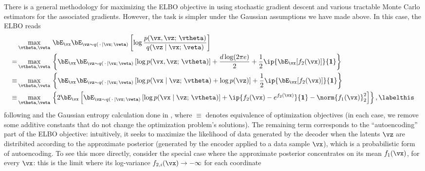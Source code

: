 \documentclass[../../book-main.tex]{subfiles}
\begin{document}
There is a general methodology for maximizing the ELBO objective in
 using stochastic gradient descent and various tractable
Monte Carlo estimators for the associated gradients. However, the task is
simpler under the Gaussian assumptions we have made above. In this case, the
ELBO reads
\begin{align*}
&\max_{\vtheta, \veta}\,
\bE_{\vx}
\bE_{\vz \sim q(\,\cdot\, \mid \vx ;\, \veta)} \left[
  \log \frac{p(\vx, \vz;\, \vtheta)}{q(\vz \mid \vx;\, \veta)}
\right]\\
=&
\max_{\vtheta, \veta}\,
\left\{
  \bE_{\vx}
  \bE_{\vz \sim q(\,\cdot\, \mid \vx ;\, \veta)} \left[
    \log p(\vx, \vz;\, \vtheta)
  \right]
  + \frac{d \log(2\pi e)}{2}
  + \frac{1}{2} \ip{ \bE_{\vx}[f_2(\vx)]}{\mathbf{1}}
\right\}
\\
\equiv &
\max_{\vtheta, \veta}\,
\left\{
  \bE_{\vx}
  \bE_{\vz \sim q(\,\cdot\, \mid \vx ;\, \veta)} \left[
    \log p(\vx \mid \vz;\, \vtheta)
    + \log p(\vz)
  \right]
  + \frac{1}{2} \ip{ \bE_{\vx}[f_2(\vx)]}{\mathbf{1}}
\right\}
\\
\equiv &
\max_{\vtheta, \veta}\,
\left\{
  2\bE_{\vx}\left[
    \bE_{\vz \sim q(\,\cdot\, \mid \vx ;\, \veta)} \left[
      \log p(\vx \mid \vz;\, \vtheta)
    \right]
    + \ip{ f_2(\vx) - e^{f_2(\vx)}}{\mathbf{1}}
    - \norm{f_1(\vx)}_2^2
  \right]
\right\}, \labelthis \label{eq:elbo-for-gaussians}
\end{align*}
following  and the Gaussian entropy calculation done in , where $\equiv$
denotes equivalence of optimization objectives (in each case, we remove some
additive constants that do not change the optimization problem's solutions).
The remaining term corresponds to the ``autoencoding'' part of the ELBO
objective: intuitively, it seeks to maximize the likelihood of data generated by
the decoder when the latents $\vz$ are distribited according to the approximate
posterior (generated by the encoder applied to a data sample $\vx$), which is
a probabilistic form of autoencoding.
To see this more directly, consider the special case where the approximate
posterior concentrates on its mean $f_1(\vx)$, for every $\vx$: this
is the limit
where its log-variance $f_{2,i}(\vx) \to -\infty$ for each coordinate
\end{document}
